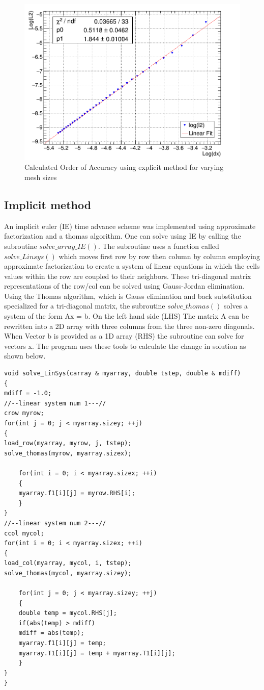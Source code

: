 \documentclass[paper=a4, fontsize=11pt, abstract=on]{scrartcl}
\numberwithin{equation}{section}		%
\numberwithin{figure}{section}			%
\numberwithin{table}{section}				%
\begin{document}
\begin{figure}[H]
\centering
\includegraphics[width=0.85\linewidth]{orderexplicit}
\caption{Calculated Order of Accuracy using explicit method for varying mesh sizes}
\label{expord}
\end{figure}

\subsection{Implicit method}
An implicit euler (IE) time advance scheme was implemented using approximate factorization and a thomas algorithm. One can solve using IE by calling the subroutine $solve\_ array\_ IE()$. The subroutine uses a function called $solve\_ Linsys()$ which moves first row by row then column by column employing approximate factorization to create a system of linear equations in which the cells values within the row are coupled to their neighbors. These tri-diagonal matrix representations of the row/col can be solved using Gauss-Jordan elimination. Using the Thomas algorithm, which is Gauss elimination and back substitution specialized for a tri-diagonal matrix, the subroutine $solve\_ thomas()$ solves a system of the form Ax = b. On the left hand side (LHS) The matrix A can be rewritten into a 2D array with three columns from the three non-zero diagonals. When Vector b is provided as a 1D array (RHS) the subroutine can solve for vectors x. The program uses these tools to calculate the change in solution as shown below.

\begin{lstlisting}
void solve_LinSys(carray & myarray, double tstep, double & mdiff)
{
mdiff = -1.0;
//--linear system num 1---//
crow myrow;
for(int j = 0; j < myarray.sizey; ++j)
{
load_row(myarray, myrow, j, tstep);
solve_thomas(myrow, myarray.sizex);

    for(int i = 0; i < myarray.sizex; ++i)
    {
    myarray.f1[i][j] = myrow.RHS[i];
    }
}
//--linear system num 2---//
ccol mycol;
for(int i = 0; i < myarray.sizex; ++i)
{
load_col(myarray, mycol, i, tstep);
solve_thomas(mycol, myarray.sizey);

    for(int j = 0; j < myarray.sizey; ++j)
    {
    double temp = mycol.RHS[j];
    if(abs(temp) > mdiff)
    mdiff = abs(temp);
    myarray.f1[i][j] = temp;
    myarray.T1[i][j] = temp + myarray.T1[i][j];
    }
}
}
\end{lstlisting}
\end{document}
